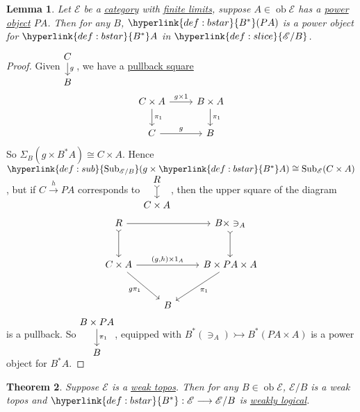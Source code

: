 \documentclass{article}
\DeclareMathOperator{\ob}{ob}
\DeclareMathOperator{\Sub}{Sub}
\newenvironment{tikzcdi}{\begin{tikzcd}[cramped, sep=scriptsize]}{\end{tikzcd}}
\let\to\longrightarrow
\newtheorem{nthm}{Theorem}[section]
\newtheorem{nlemma}[nthm]{Lemma}
\begin{document}
\begin{nlemma}\label{lem:7.11}
  Let $\mathscr{E}$ be a \hyperlink{def:cat}{category} with \hyperlink{def:limit}{finite limits}, suppose $A \in \ob \mathscr{E}$ has a \hyperlink{def:power}{power object} $PA$.
  Then for any $B$, $\hyperlink{def:bstar}{B^*}(PA)$ is a power object for $\hyperlink{def:bstar}{B^*}A$ in $\hyperlink{def:slice}{\mathscr{E}/B}$.
\end{nlemma}
\begin{proof}
  Given $\begin{tikzcdi}C \dar{g}\\B\end{tikzcdi}$, we have a \hyperlink{def:pullback}{pullback square}
  \begin{equation*}
    \begin{tikzcd}
      C \times A \rar{g \times 1} \dar{\pi_1} & B \times A \dar{\pi_1} \\
      C \rar{g} & B
    \end{tikzcd}
  \end{equation*}
  So $\Sigma_B(g \times B^* A) \cong C \times A$.
  Hence $\hyperlink{def:sub}{\Sub_{\mathscr{E}/B}} (g \times \hyperlink{def:bstar}{B^*} A) \cong \Sub_{\mathscr{E}} (C \times A)$, but if $C \overset{h}\to PA$ corresponds to $\begin{tikzcdi} R \dar[tail] \\ C \times A \end{tikzcdi}$, then the upper square of the diagram
  \begin{equation*}
    \begin{tikzcd}[row sep=large]
      R \ar[d, tail] \arrow[rr]  && B \times \ni_A \ar[d, tail] \\
      C \times A \arrow[rr, "{(g,h)} \times 1_A"] \arrow[dr, "g \pi_1"']&& B \times PA \times A \arrow[dl, "\pi_1"]\\
                                          & B
    \end{tikzcd}
  \end{equation*}
  is a pullback.
  So $\begin{tikzcd}[cramped] B \times PA \dar{\pi_1} \\ B\end{tikzcd}$, equipped with $B^*(\ni_A) \rightarrowtail B^*(PA \times A)$ is a power object for $B^* A$.
\end{proof}
\begin{nthm}\label{cor:7.12}
  Suppose $\mathscr{E}$ is a \hyperlink{def:wtopos}{weak topos}.
  Then for any $B \in \ob \mathscr{E}$, \hyperlink{def:slice}{$\mathscr{E}/B$} is a weak topos and $\hyperlink{def:bstar}{B^*}: \mathscr{E} \to \mathscr{E}/B$ is \hyperlink{def:lFunct}{weakly logical}.
\end{nthm}
\end{document}
